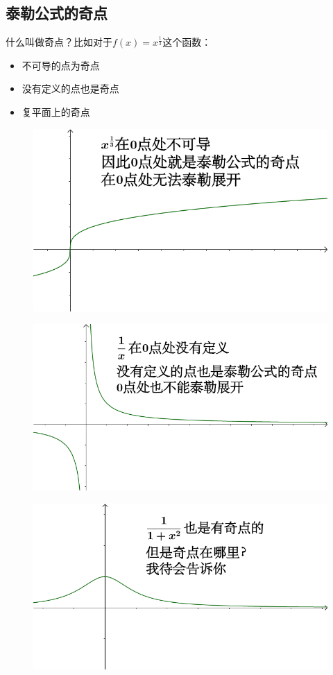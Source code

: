 \documentclass[12pt]{article}
\begin{document}
\subsection{泰勒公式的奇点}
什么叫做奇点？比如对于$f(x)=x^{\frac{1}{3}}$这个函数：
\begin{itemize}
    \item 不可导的点为奇点
    \item 没有定义的点也是奇点
    \item 复平面上的奇点
\end{itemize}
\begin{figure}[H]
  \centering
  \includegraphics[width=.8\textwidth]{fig/TaylorExpansion_4.png} 
\end{figure}
\begin{figure}[H]
  \centering
  \includegraphics[width=.8\textwidth]{fig/TaylorExpansion_5.png} 
\end{figure}
\begin{figure}[H]
  \centering
  \includegraphics[width=.8\textwidth]{fig/TaylorExpansion_6.png} 
\end{figure}
\end{document}
